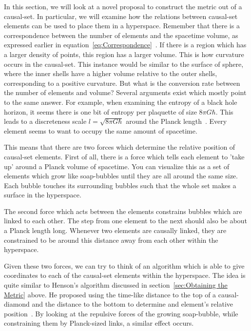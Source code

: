 \documentclass[a4paper,12pt]{article}
\numberwithin{equation}{section}
\begin{document}
In this section, we will look at a novel proposal to construct the metric out of a causal-set. In particular, we will examine how the relations between causal-set elements can be used to place them in a hyperspace. Remember that there is a correspondence between the number of elements and the spacetime volume, as expressed earlier in equation~\ref{eq:Correspondence}~\cite{Bombelli1987}. If there is a region which has a larger density of points, this region has a larger volume. This is how curvature occurs in the causal-set. This instance would be similar to the surface of sphere, where the inner shells have a higher volume relative to the outer shells, corresponding to a positive curvature. But what is the conversion rate between the number of elements and volume? Several arguments exist which mostly point to the same answer. For example, when examining the entropy of a black hole horizon, it seems there is one bit of entropy per plaquette of size $8\pi G\hbar$. This leads to a discreteness scale $l=\sqrt{8\pi G\hbar}$ around the Planck length~\cite{Sorkin2003}. Every element seems to want to occupy the same amount of spacetime.

This means that there are two forces which determine the relative position of causal-set elements. First of all, there is a force which tells each element to 'take up' around a Planck volume of spacetime. You can visualize this as a set of elements which grow like soap-bubbles until they are all around the same size. Each bubble touches its surrounding bubbles such that the whole set makes a surface in the hyperspace.

The second force which acts between the elements constrains bubbles which are linked to each other. The step from one element to the next should also be about a Planck length long. Whenever two elements are causally linked, they are constrained to be around this distance away from each other within the hyperspace.

Given these two forces, we can try to think of an algorithm which is able to give coordinates to each of the causal-set elements within the hyperspace. The idea is quite similar to Henson's algorithm discussed in section~\ref{sec:Obtaining the Metric} above. He proposed using the time-like distance to the top of a causal-diamond and the distance to the bottom to determine and element's relative position~\cite{Henson2006}. By looking at the repulsive forces of the growing soap-bubble, while constraining them by Planck-sized links, a similar effect occurs.
\end{document}
